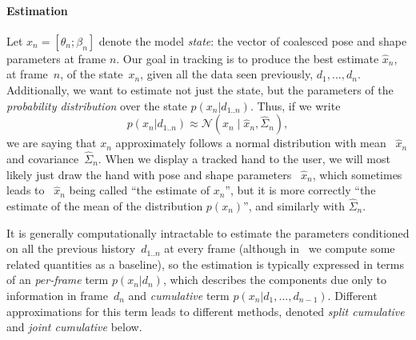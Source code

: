 \paragraph{Estimation}
Let $x_n = [\theta_n; \beta_n]$ denote the model {\em state}: the vector of coalesced pose and shape parameters at frame $n$.  
Our goal in tracking is to produce the best estimate $\hat{x}_n$, at frame~$n$, of the state~$x_n$, given all the data seen previously, $d_1, ..., d_n$.
Additionally, we want to estimate not just the state, but the parameters of the {\em probability distribution} over the state $p(x_n|d_{1..n})$.  Thus, if we write
\begin{equation}
p(x_n|d_{1..n}) \approx \mathcal N(x_n \mid \hat{x}_n, \hat{\Sigma}_n),
\end{equation}
we are saying that $x_n$ approximately follows a normal distribution with mean ~$\hat x_n$ and covariance~$\hat\Sigma_n$.  When we display a tracked hand to the user, we will most likely just draw the hand with pose and shape parameters~ $\hat x_n$, which sometimes leads to ~$\hat x_n$ being called ``the estimate of $x_n$'', but it is more correctly ``the estimate of the mean of the distribution $p(x_n)$'', and similarly with $\hat\Sigma_n$.

It is generally computationally intractable to estimate the parameters conditioned on all the previous history~$d_{1..n}$ at every frame (although in~ we compute some related quantities as a baseline), so the estimation is typically expressed in terms of an {\em per-frame} term $p(x_n|d_n)$, which describes the components due only to information in frame~$d_n$ and {\em cumulative} term $p(x_n|d_1, ..., d_{n-1})$.  Different approximations for this term leads to different methods, denoted {\em split cumulative} and {\em joint cumulative} below.




